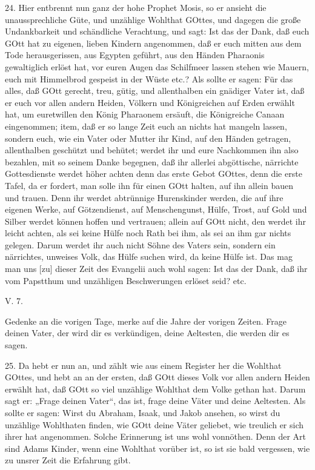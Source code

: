 24. Hier entbrennt nun ganz der hohe Prophet Mosis, so er ansieht die unaussprechliche Güte, und unzählige Wohlthat GOttes, und dagegen die große Undankbarkeit und schändliche Verachtung, und sagt: Ist das der Dank, daß euch GOtt hat zu eigenen, lieben Kindern angenommen, daß er euch mitten aus dem Tode herausgerissen, aus Egypten geführt, aus den Händen Pharaonis gewaltiglich erlöst hat, vor euren Augen das Schilfmeer lassen stehen wie Mauern, euch mit Himmelbrod gespeist in der Wüste etc.? Als sollte er sagen: Für das alles, daß GOtt gerecht, treu, gütig, und allenthalben ein gnädiger Vater ist, daß er euch vor allen andern Heiden, Völkern und Königreichen auf Erden erwählt hat, um euretwillen den König Pharaonem ersäuft, die Königreiche Canaan eingenommen; item, daß er so lange Zeit euch an nichts hat mangeln lassen, sondern euch, wie ein Vater oder Mutter ihr Kind, auf den Händen getragen, allenthalben geschützt und behütet; werdet ihr und eure Nachkommen ihn also bezahlen, mit so seinem Danke begegnen, daß ihr allerlei abgöttische, närrichte Gottesdienste werdet höher achten denn das erste Gebot GOttes, denn die erste Tafel, da er fordert, man solle ihn für einen GOtt halten, auf ihn allein bauen und trauen. Denn ihr werdet abtrünnige Hurenskinder werden, die auf ihre eigenen Werke, auf Götzendienst, auf Menschengunst, Hülfe, Trost, auf Gold und Silber werdet können hoffen und vertrauen; allein auf GOtt nicht, den werdet ihr leicht achten, als sei keine Hülfe noch Rath bei ihm, als sei an ihm gar nichts gelegen. Darum werdet ihr auch nicht Söhne des Vaters sein, sondern ein närrichtes, unweises Volk, das Hülfe suchen wird, da keine Hülfe ist. Das mag man uns [zu] dieser Zeit des Evangelii auch wohl sagen: Ist das der Dank, daß ihr vom Papstthum und unzähligen Beschwerungen erlöset seid? etc.

\begin{schriftzitat}
V. 7.
\end{schriftzitat}

Gedenke an die vorigen Tage, merke auf die Jahre der vorigen Zeiten. Frage deinen Vater, der wird dir es verkündigen, deine Aeltesten, die werden dir es sagen.

25. Da hebt er nun an, und zählt wie aus einem Register her die Wohlthat GOttes, und hebt an an der ersten, daß GOtt dieses Volk vor allen andern Heiden erwählt hat, daß GOtt so viel unzählige Wohlthat dem Volke gethan hat. Darum sagt er: „Frage deinen Vater“, das ist, frage deine Väter und deine Aeltesten. Als sollte er sagen: Wirst du Abraham, Isaak, und Jakob ansehen, so wirst du unzählige Wohlthaten finden, wie GOtt deine Väter geliebet, wie treulich er sich ihrer hat angenommen. Solche Erinnerung ist uns wohl vonnöthen. Denn der Art sind Adams Kinder, wenn eine Wohlthat vorüber ist, so ist sie bald vergessen, wie zu unsrer Zeit die Erfahrung gibt.

